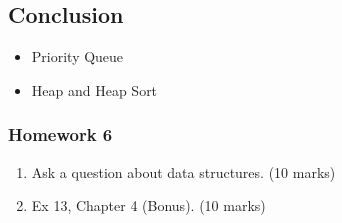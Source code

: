 \documentclass[aspectratio=169, 14pt]{beamer}
\begin{document}
\begin{frame}

    \section{\textcolor{darkmidnightblue}{Conclusion}}
    \begin{itemize}
        \item Priority Queue
        \item Heap and Heap Sort
    \end{itemize}
\end{frame}


\begin{frame}
    \frametitle{Homework 6}
\begin{enumerate}
    \item Ask a question about data structures. (10 marks)
    \item Ex 13, Chapter 4 (Bonus). (10 marks) 
\end{enumerate}
\end{frame}
\end{document}
